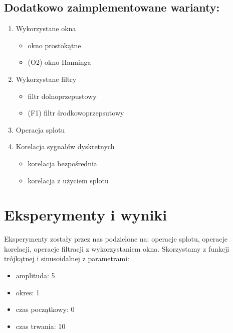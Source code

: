 \documentclass[12pt]{article}
\begin{document}
\subsection {Dodatkowo zaimplementowane warianty:}
\begin {enumerate}
\item Wykorzystane okna
\begin {itemize}
 \item okno prostokątne
\item (O2) okno Hanninga
\end {itemize}
\item Wykorzystane filtry
\begin {itemize}
\item filtr dolnoprzepustowy
\item (F1) filtr środkowoprzepsutowy
\end {itemize}
\item  Operacja splotu  
\item Korelacja sygnałów dyskretnych 
\begin {itemize}
\item korelacja bezpośrednia
\item korelacja z użyciem splotu
\end {itemize}
\end{enumerate}

\section{Eksperymenty i wyniki}
Eksperymenty zostały przez nas podzielone na: operacje splotu, operacje korelacji, operacje filtracji z wykorzystaniem okna. Skorzystamy z funkcji trójkątnej i sinusoidalnej z parametrami:
\begin{itemize}
\item amplituda: 5
\item okres: 1
\item czas początkowy: 0
\item czas trwania: 10
\end{itemize}
\end{document}
